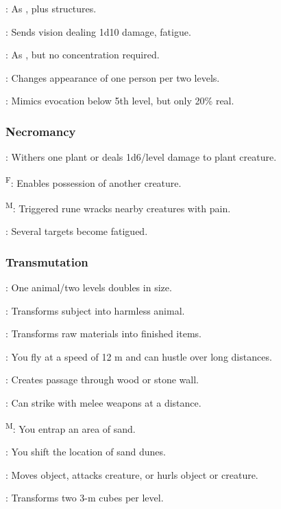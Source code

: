 	: As , plus structures.

	: Sends vision dealing 1d10 damage, fatigue.

	: As , but no concentration required.

	: Changes appearance of one person per two levels.

	: Mimics evocation below 5th level, but only 20\% real.

\subsubsection{Necromancy}
	: Withers one plant or deals 1d6/level damage to plant creature.

	\textsuperscript{F}: Enables possession of another creature.

	\textsuperscript{M}: Triggered rune wracks nearby creatures with pain.

	: Several targets become fatigued.

\subsubsection{Transmutation}
	: One animal/two levels doubles in size.
	
	: Transforms subject into harmless animal.
	
	: Transforms raw materials into finished items.
	
	: You fly at a speed of 12 m and can hustle over long distances.
	
	: Creates passage through wood or stone wall.
	
	: Can strike with melee weapons at a distance. %
	
	\textsuperscript{M}: You entrap an area of sand. %
	
	: You shift the location of sand dunes. %
	
	: Moves object, attacks creature, or hurls object or creature.
	
	: Transforms two 3-m cubes per level.
	
